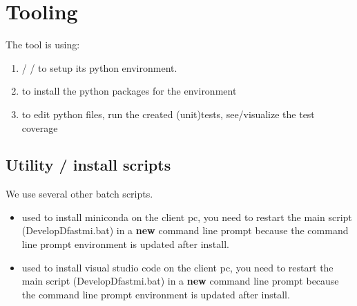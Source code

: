 \section{Tooling}
The tool is using:
\begin{enumerate}
\item {} /  / to setup its python environment. 
\item {} to install the python packages for the environment
\item {} to edit python files, run the created (unit)tests, see/visualize the test coverage
\end{enumerate}

\subsection{Utility / install scripts}
We use several other batch scripts.
\begin{itemize}
	\item {} used to install miniconda on the client pc, you need to restart the main script (DevelopDfastmi.bat) in a \textbf{new} command line prompt because the command line prompt environment is
	 updated after install.
	\item {} used to install visual studio code on the client pc, you need to restart the main script (DevelopDfastmi.bat) in a \textbf{new} command line prompt because the command line prompt environment is updated after install.
\end{itemize}

